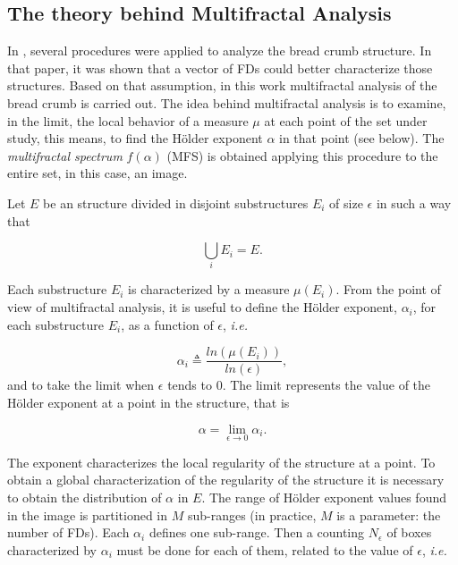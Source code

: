 \documentclass[a4paper,10pt]{article}
\begin{document}
\subsection{The theory behind Multifractal Analysis}
\label{sec:4}

In \cite{Gonzales2008}, several procedures were applied to analyze the bread crumb structure. In that paper, it was shown that a vector of FDs could better characterize those structures. Based on that assumption, in this work multifractal analysis of the bread crumb is carried out. The idea behind multifractal analysis is to examine, in the limit, the local behavior of a measure $\mu$ at each point of the set under study, this means, to find the H\"older exponent $\alpha$ in that point (see below). The {\em multifractal spectrum} $f(\alpha)$ (MFS) is obtained applying this procedure to the entire set, in this case, an image.

Let $E$ be an structure divided in disjoint substructures $E_{i}$ of size $\epsilon$ in such a way that 

\begin{equation}
\displaystyle\bigcup_{i}E_{i} = E.
\end{equation}

Each substructure $E_{i}$ is characterized by a measure $\mu(E_{i})$. From the point of view of multifractal analysis, it is useful to define the H\"older exponent, $\alpha_{i}$, for each substructure $E_{i}$, as a function of $\epsilon$, {\em i.e.}


\begin{equation}
\alpha_{i} \triangleq \frac{ln(\mu(E_{i}))}{ln(\epsilon)},
\label{eqn:eqn4}
\end{equation}
\noindent
and to take the limit when $\epsilon$ tends to $0$. The limit represents the value of the H\"older exponent at a point in the structure, that is

\begin{equation}
\alpha = \lim_{\epsilon\to0}{\alpha_{i}}.
\label{eqn:eqn5}
\end{equation}

The exponent characterizes the local regularity of the structure at a point. To obtain a global characterization of the regularity of the structure it is necessary to obtain the distribution of $\alpha$ in $E$. The range of H\"older exponent values found in the image is partitioned in $M$ sub-ranges (in practice, $M$ is a parameter: the number of FDs). Each $\alpha_{i}$ defines one sub-range. Then a counting $N_{\epsilon}$ of boxes characterized by $\alpha_{i}$ must be done for each of them, related to the value of $\epsilon$, {\em i.e.}
\end{document}
